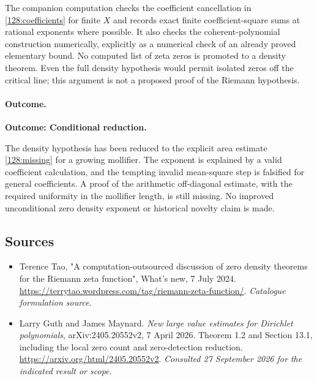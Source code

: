 \documentclass[11pt,a4paper]{article}
\numberwithin{equation}{section}
\begin{document}
The companion computation checks the coefficient cancellation in
\eqref{128:coefficients} for finite $X$ and records exact finite
coefficient-square sums at rational exponents where possible.  It also
checks the coherent-polynomial construction numerically, explicitly as
a numerical check of an already proved elementary bound.  No computed
list of zeta zeros is promoted to a density theorem.  Even the full
density hypothesis would permit isolated zeros off the critical line;
this argument is not a proposed proof of the Riemann hypothesis.

\paragraph{Outcome.}
\textbf{Outcome: Conditional reduction.}

The density hypothesis has been reduced to the explicit area estimate
\eqref{128:missing} for a growing mollifier.  The exponent is explained
by a valid coefficient calculation, and the tempting invalid
mean-square step is falsified for general coefficients.  A proof of the
arithmetic off-diagonal estimate, with the required uniformity in the
mollifier length, is still missing.  No improved unconditional zero
density exponent or historical novelty claim is made.
\subsection{Sources}
\begin{itemize}\raggedright
\item[\textnormal{[S1]}]\hypertarget{source:128:1}{} Terence Tao, "A computation-outsourced discussion of zero density theorems for the Riemann zeta function", What's new, 7 July 2024.
\url{https://terrytao.wordpress.com/tag/riemann-zeta-function/}.
{\small\textit{Catalogue formulation source.}}
\item[\textnormal{[E1]}]\hypertarget{extra:128:1}{} Larry Guth and James Maynard.
\emph{New large value estimates for Dirichlet polynomials}, arXiv:2405.20552v2, 7 April 2026. Theorem 1.2 and Section 13.1, including the local zero count and zero-detection reduction.
\url{https://arxiv.org/html/2405.20552v2}.
{\small\textit{Consulted 27 September 2026 for the indicated result or scope.}}
\end{itemize}
\end{document}
